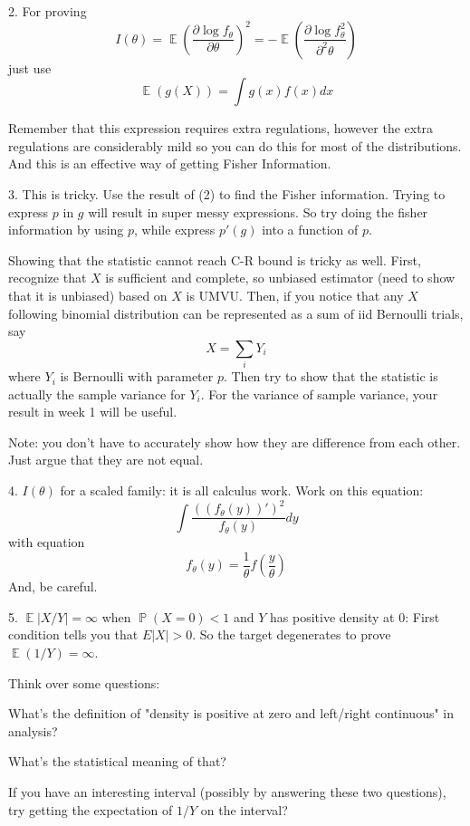 \documentclass[12pt]{article}
\newcommand{\E}{\operatorname{\mathbb{E}}}
\renewcommand{\P}{\operatorname{\mathbb{P}}}
\begin{document}
2. For proving
$$
I(\theta) = \E (\frac{\partial \log f_\theta}{\partial \theta})^2 = - \E (\frac{\partial \log f_\theta^2}{\partial^2 \theta})
$$
just use
$$
\E (g(X)) = \int g(x) f(x) dx
$$

Remember that this expression requires extra regulations, however the extra regulations are considerably mild so you can do this for most of the distributions. And this is an effective way of getting Fisher Information.

3. This is tricky. Use the result of (2) to find the Fisher information. Trying to express $p$ in $g$ will result in super messy expressions. So try doing the fisher information by using $p$, while express $p'(g)$ into a function of $p$.

Showing that the statistic cannot reach C-R bound is tricky as well. First, recognize that $X$ is sufficient and complete, so unbiased estimator (need to show that it is unbiased) based on $X$ is UMVU. Then, if you notice that any $X$ following binomial distribution can be represented as a sum of iid Bernoulli trials, say
$$
X = \sum_i Y_i
$$
where $Y_i$ is Bernoulli with parameter $p$. Then try to show that the statistic is actually the sample variance for $Y_i$. For the variance of sample variance, your result in week 1 will be useful.

Note: you don't have to accurately show how they are difference from each other. Just argue that they are not equal. 

4. $I(\theta)$ for a scaled family: it is all calculus work. Work on this equation:
$$
\int \frac{((f_\theta(y))')^2}{f_\theta(y)} dy
$$
with equation
$$
f_\theta(y) = \frac{1}{\theta} f(\frac{y}{\theta})
$$
And, be careful.

5. $\E|X/Y| = \infty$ when $\P(X = 0) <1 $ and $Y$ has positive density at $0$: First condition tells you that $E|X|> 0$. So the target degenerates to prove $\E(1/Y) = \infty$. 

Think over some questions:

What's the definition of "density is positive at zero and left/right continuous" in analysis?

What's the statistical meaning of that?

If you have an interesting interval (possibly by answering these two questions), try getting the expectation of $1/Y$ on the interval?
\end{document}
